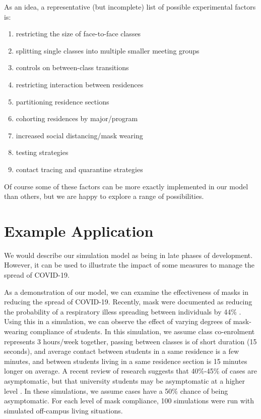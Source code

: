 \documentclass[fleqn,10pt]{SelfArx} %
\begin{document}
As an idea, a representative (but incomplete) list of possible experimental factors is:
\begin{enumerate}
    \setlength{\itemsep}{1pt}
    \setlength{\parskip}{0pt}
    \setlength{\parsep}{0pt}

    \item restricting the size of face-to-face classes

    \item splitting single classes into multiple smaller meeting groups

    \item controls on between-class transitions

    \item restricting interaction between residences

    \item partitioning residence sections

    \item cohorting residences by major/program

    \item increased social distancing/mask wearing

    \item testing strategies

    \item contact tracing and quarantine strategies


\end{enumerate}
Of course some of these factors can be more exactly implemented in our model than others, but we are happy to explore a range of possibilities.




\section{Example Application}
\label{sec:prelimresults}


We would describe our simulation model as being in late phases of development.  However, it can be used to illustrate the impact of some measures to manage the spread of COVID-19.  

As a demonstration of our model, we can examine the effectiveness of masks in reducing the spread of COVID-19.  Recently, mask were documented as reducing the probability of a respiratory illess spreading between individuals by 44\%  \cite{chu_physical_2020}.  Using this in a simulation, we can observe the effect of varying degrees of mask-wearing compliance of students.  In this simulation, we assume class co-enrolment represents 3 hours/week together, passing between classes is of short duration (15 seconds), and average contact between students in a same residence is a few minutes, and between students living in a same residence section is 15 minutes longer on average.  A recent review of research suggests that 40\%-45\% of cases are asymptomatic, but that university students may be asymptomatic at a higher level \cite{oran_prevalence_2020}.  In these simulations, we assume cases have a 50\% chance of being asymptomatic.  For each level of mask compliance, 100 simulations were run with simulated off-campus living situations.  
\end{document}
